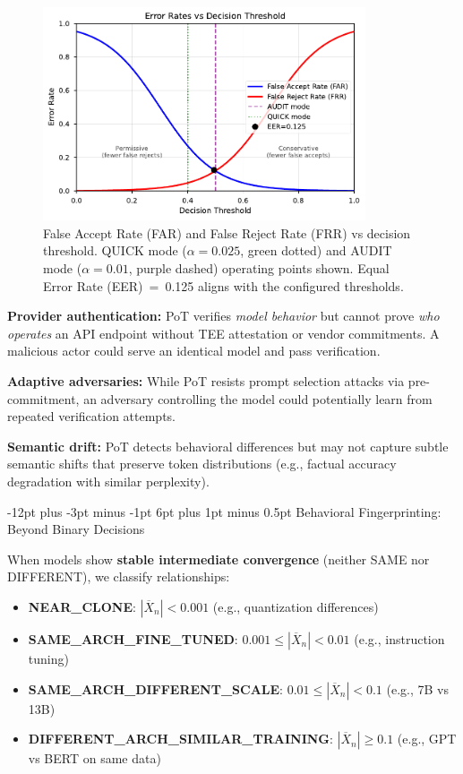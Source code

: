 \documentclass[11pt]{article}
\makeatletter
\renewcommand\subsection{\@startsection{subsection}{2}{\z@}%
  {-12pt plus -3pt minus -1pt}%
  {6pt plus 1pt minus 0.5pt}%
  {\normalfont\large\bfseries}}
\makeatother
\begin{document}
\begin{figure}[ht!]
\centering
\includegraphics[width=0.85\textwidth]{figures/fig2_error_rates.pdf}
\caption{False Accept Rate (FAR) and False Reject Rate (FRR) vs decision threshold. QUICK mode ($\alpha=0.025$, green dotted) and AUDIT mode ($\alpha=0.01$, purple dashed) operating points shown. Equal Error Rate (EER)~=~0.125 aligns with the configured thresholds.}
\label{fig:error-rates}
\end{figure}

\textbf{Provider authentication:} PoT verifies \emph{model behavior} but cannot prove \emph{who operates} an API endpoint without TEE attestation or vendor commitments. A malicious actor could serve an identical model and pass verification.

\textbf{Adaptive adversaries:} While PoT resists prompt selection attacks via pre-commitment, an adversary controlling the model could potentially learn from repeated verification attempts.

\textbf{Semantic drift:} PoT detects behavioral differences but may not capture subtle semantic shifts that preserve token distributions (e.g., factual accuracy degradation with similar perplexity).

\subsection{Behavioral Fingerprinting: Beyond Binary Decisions}
\label{sec:behavioral-fingerprinting}

When models show \textbf{stable intermediate convergence} (neither SAME nor DIFFERENT), we classify relationships:
\begin{itemize}
\item \textbf{NEAR\_CLONE}: $|\overline{X}_n| < 0.001$ (e.g., quantization differences)
\item \textbf{SAME\_ARCH\_FINE\_TUNED}: $0.001 \leq |\overline{X}_n| < 0.01$ (e.g., instruction tuning)
\item \textbf{SAME\_ARCH\_DIFFERENT\_SCALE}: $0.01 \leq |\overline{X}_n| < 0.1$ (e.g., 7B vs 13B)
\item \textbf{DIFFERENT\_ARCH\_SIMILAR\_TRAINING}: $|\overline{X}_n| \geq 0.1$ (e.g., GPT vs BERT on same data)
\end{itemize}
\end{document}

